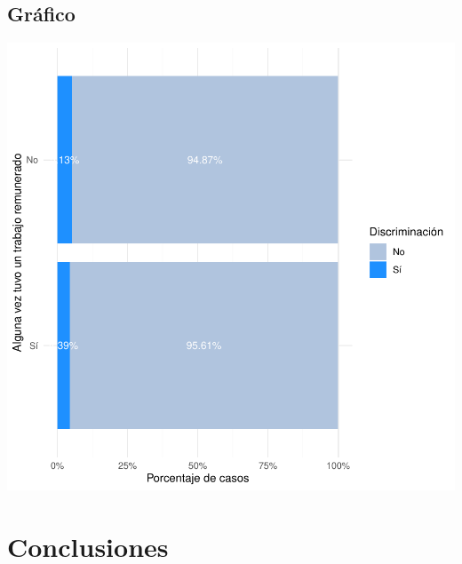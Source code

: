 \documentclass{article}
\begin{document}
\subsection{Gráfico}
\includegraphics{Informetecnico-005}


\section*{Conclusiones}
\end{document}

